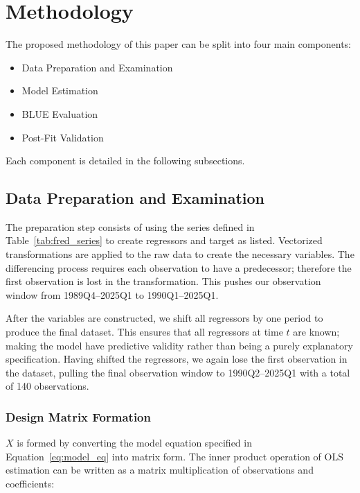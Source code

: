 \section{Methodology}\label{sec:methodology}

The proposed methodology of this paper can be split into four main components:
\begin{itemize}
    \item Data Preparation and Examination
    \item Model Estimation 
    \item BLUE Evaluation
    \item Post-Fit Validation
\end{itemize}

Each component is detailed in the following subsections.

\subsection{Data Preparation and Examination}\label{subsec:data_prep_exam}
The preparation step consists of using the series defined in Table~\ref{tab:fred_series} to create regressors and target as listed.
Vectorized transformations are applied to the raw data to create the necessary variables.
The differencing process requires each observation to have a predecessor; therefore the first observation is lost in the transformation.
This pushes our observation window from 1989Q4--2025Q1 to 1990Q1--2025Q1.

\vspace{\baselineskip}

After the variables are constructed, we shift all regressors by one period to produce the final dataset.
This ensures that all regressors at time $t$ are known; making the model have predictive validity rather than being a purely explanatory specification. 
Having shifted the regressors, we again lose the first observation in the dataset, pulling the final observation window to 1990Q2--2025Q1 with a total of 140 observations.

\subsubsection{Design Matrix Formation}\label{subsubsec:inp_mat}
$X$ is formed by converting the model equation specified in Equation~\ref{eq:model_eq} into matrix form.
The inner product operation of OLS estimation can be written as a matrix multiplication of observations and coefficients:

